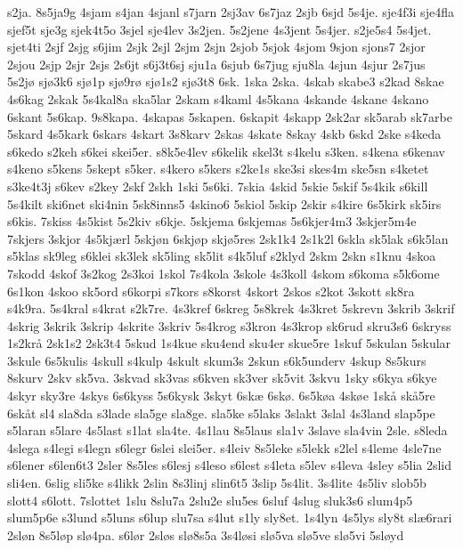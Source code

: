 s2ja.
8s5ja9g
4sjam
s4jan
4sjanl
s7jarn
2sj3av
6s7jaz
2sjb
6sjd
5s4je.
sje4f3i
sje4fla
sjef5t
sje3g
sjek4t5o
3sjel
sje4lev
3s2jen.
5s2jene
4s3jent
5s4jer.
s2je5s4
5s4jet.
sjet4ti
2sjf
2sjg
s6jim
2sjk
2sjl
2sjm
2sjn
2sjob
5sjok
4sjom
9sjon
sjons7
2sjor
2sjou
2sjp
2sjr
2sjs
2s6jt
s6j3t6sj
sju1a
6sjub
6s7jug
sju8la
4sjun
4sjur
2s7jus
5s2j^^f8
sj^^f83k6
sj^^f81p
sj^^f89r^^f8
sj^^f81s2
sj^^f83t8
6sk.
1ska
2ska.
4skab
skabe3
s2kad
8skae
4s6kag
2skak
5s4kal8a
ska5lar
2skam
s4kaml
4s5kana
4skande
4skane
4skano
6skant
5s6kap.
9s8kapa.
4skapas
5skapen.
6skapit
4skapp
2sk2ar
sk5arab
sk7arbe
5skard
4s5kark
6skars
4skart
3s8karv
2skas
4skate
8skay
4skb
6skd
2ske
s4keda
s6kedo
s2keh
s6kei
skei5er.
s8k5e4lev
s6kelik
skel3t
s4kelu
s3ken.
s4kena
s6kenav
s4keno
s5kens
5skept
s5ker.
s4kero
s5kers
s2ke1s
ske3si
skes4m
ske5sn
s4ketet
s3ke4t3j
s6kev
s2key
2skf
2skh
1ski
5s6ki.
7skia
4skid
5skie
5skif
5s4kik
s6kill
5s4kilt
ski6net
ski4nin
5sk8inns5
4skino6
5skiol
5skip
2skir
s4kire
6s5kirk
sk5irs
s6kis.
7skiss
4s5kist
5s2kiv
s6kje.
5skjema
6skjemas
5s6kjer4m3
3skjer5m4e
7skjers
3skjor
4s5kj^^e6rl
5skj^^f8n
6skj^^f8p
skj^^f85res
2sk1k4
2s1k2l
6skla
sk5lak
s6k5lan
s5klas
sk9leg
s6klei
sk3lek
sk5ling
sk5lit
s4k5luf
s2klyd
2skm
2skn
s1knu
4skoa
7skodd
4skof
3s2kog
2s3koi
1skol
7s4kola
3skole
4s3koll
4skom
s6koma
s5k6ome
6s1kon
4skoo
sk5ord
s6korpi
s7kors
s8korst
4skort
2skos
s2kot
3skott
sk8ra
s4k9ra.
5s4kral
s4krat
s2k7re.
4s3kref
6skreg
5s8krek
4s3kret
5skrevn
3skrib
3skrif
4skrig
3skrik
3skrip
4skrite
3skriv
5s4krog
s3kron
4s3krop
sk6rud
skru3s6
6skryss
1s2kr^^e5
2sk1s2
2sk3t4
5skud
1s4kue
sku4end
sku4er
skue5re
1skuf
5skulan
5skular
3skule
6s5kulis
4skull
s4kulp
4skult
skum3s
2skun
s6k5underv
4skup
8s5kurs
8skurv
2skv
sk5va.
3skvad
sk3vas
s6kven
sk3ver
sk5vit
3skvu
1sky
s6kya
s6kye
4skyr
sky3re
4skys
6s6kyss
5s6kysk
3skyt
6sk^^e6
6sk^^f8.
6s5k^^f8a
4sk^^f8e
1sk^^e5
sk^^e55re
6sk^^e5t
sl4
sla8da
s3lade
sla5ge
sla8ge.
sla5ke
s5laks
3slakt
3slal
4s3land
slap5pe
s5laran
s5lare
4s5last
s1lat
sla4te.
4s1lau
8s5laus
sla1v
3slave
sla4vin
2sle.
s8leda
4slega
s4legi
s4legn
s6legr
6slei
slei5er.
s4leiv
8s5leke
s5lekk
s2lel
s4leme
4sle7ne
s6lener
s6len6t3
2sler
8s5les
s6lesj
s4leso
s6lest
s4leta
s5lev
s4leva
4sley
s5lia
2slid
sli4en.
6slig
sli5ke
s4likk
2slin
8s3linj
slin6t5
3slip
5s4lit.
3s4lite
4s5liv
slob5b
slott4
s6lott.
7slottet
1slu
8slu7a
2slu2e
slu5es
6sluf
4slug
sluk3s6
slum4p5
slum5p6e
s3lund
s5luns
s6lup
slu7sa
s4lut
s1ly
sly8et.
1s4lyn
4s5lys
sly8t
sl^^e66rari
2sl^^f8n
8s5l^^f8p
sl^^f84pa.
s6l^^f8r
2sl^^f8s
sl^^f88s5a
3s4l^^f8si
sl^^f85va
sl^^f85ve
sl^^f85vi
5sl^^f8yd
